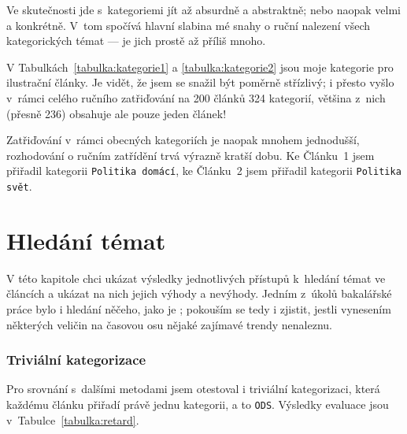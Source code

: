 \documentclass[12pt,a4paper]{report}
\begin{document}
Ve skutečnosti jde s~kategoriemi jít až absurdně  a abstraktně; nebo naopak velmi  a konkrétně. V~tom spočívá hlavní slabina mé snahy o ruční nalezení všech kategorických témat --- je jich prostě až příliš mnoho.

V Tabulkách~\ref{tabulka:kategorie1} a \ref{tabulka:kategorie2} jsou moje kategorie pro ilustrační články. Je vidět, že jsem se snažil být poměrně střízlivý; i přesto vyšlo v~rámci celého ručního zatřiďování na 200 článků 324 kategorií, většina z~nich (přesně 236) obsahuje ale pouze jeden článek!

Zatřiďování v~rámci obecných kategoriích je naopak mnohem jednodušší, roz\-ho\-do\-vá\-ní o ručním zatřídění trvá výrazně kratší dobu. Ke Článku~1 jsem přiřadil kategorii \texttt{Politika domácí}, ke Článku~2 jsem přiřadil kategorii \texttt{Politika svět}.

\section{Hledání témat}
\label{sec:hledanitemat_prezentace_vysledku}

V této kapitole chci ukázat výsledky jednotlivých přístupů k~hledání témat ve článcích a ukázat na nich jejich výhody a nevýhody. Jedním z~úkolů bakalářské práce bylo i hledání něčeho, jako je ; pokouším se tedy i zjistit, jestli vynesením některých veličin na časovou osu nějaké zajímavé trendy nenaleznu.


\subsubsection{Triviální kategorizace}



Pro srovnání s~dalšími metodami jsem otestoval i triviální kategorizaci, která každému článku přiřadí právě jednu kategorii, a to \texttt{ODS}. Výsledky evaluace jsou v~Tabulce~\ref{tabulka:retard}.
\end{document}
